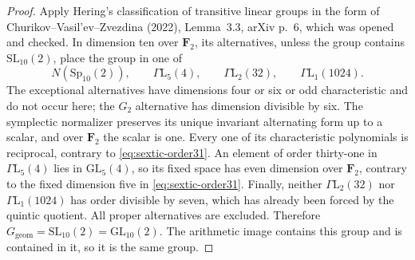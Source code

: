 \begin{proof}
Apply Hering's classification of transitive linear groups in the
form of Churikov--Vasil'ev--Zvezdina (2022), Lemma~3.3, arXiv p.~6,
which was opened and checked.  In dimension ten over $\mathbf F_2$,
its alternatives, unless the group contains $\mathrm{SL}_{10}(2)$,
place the group in one of
\[
 N(\mathrm{Sp}_{10}(2)),\qquad
 \Gamma\mathrm L_5(4),\qquad
 \Gamma\mathrm L_2(32),\qquad
 \Gamma\mathrm L_1(1024).
\]
The exceptional alternatives have dimensions four or six or odd
characteristic and do not occur here; the $G_2$ alternative has
dimension divisible by six.
The symplectic normalizer preserves its unique invariant alternating
form up to a scalar, and over $\mathbf F_2$ the scalar is one.
Every one of its characteristic polynomials is reciprocal, contrary
to \eqref{eq:sextic-order31}.
An element of order thirty-one in $\Gamma\mathrm L_5(4)$ lies in
$\mathrm{GL}_5(4)$, so its fixed space has even dimension over
$\mathbf F_2$, contrary to the fixed dimension five in
\eqref{eq:sextic-order31}.
Finally, neither $\Gamma\mathrm L_2(32)$ nor
$\Gamma\mathrm L_1(1024)$ has order divisible by seven, which has
already been forced by the quintic quotient.
All proper alternatives are excluded.  Therefore
$G_{\mathrm{geom}}=\mathrm{SL}_{10}(2)=\mathrm{GL}_{10}(2)$.
The arithmetic image contains this group and is contained in it,
so it is the same group.
\end{proof}
